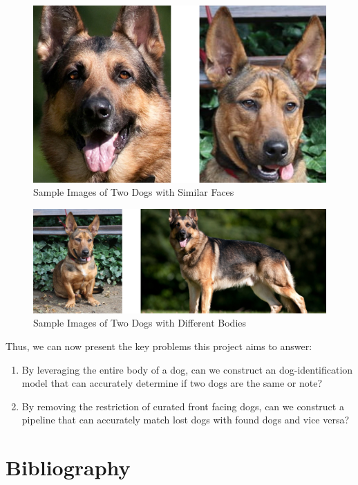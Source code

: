 \documentclass{article}
\begin{document}
\begin{figure}[h]
\centering
	\includegraphics{final-report-images/similar_faces.png}
\caption{Sample Images of Two Dogs with Similar Faces}
\label{fig:x similar faces}
\end{figure}

\newpage

\begin{figure}[h]
\centering
	\includegraphics{final-report-images/different_bodies.png}
\caption{Sample Images of Two Dogs with Different Bodies}
\label{fig:x different bodies}
\end{figure}

Thus, we can now present the key problems this project aims to answer:

\begin{enumerate}
  \item By leveraging the entire body of a dog, can we construct an dog-identification model that can accurately determine if two dogs are the same or note?
  \item By removing the restriction of curated front facing dogs, can we construct a pipeline that can accurately match lost dogs with found dogs and vice versa? 
\end{enumerate}



\newpage
\section*{Bibliography}
\end{document}
